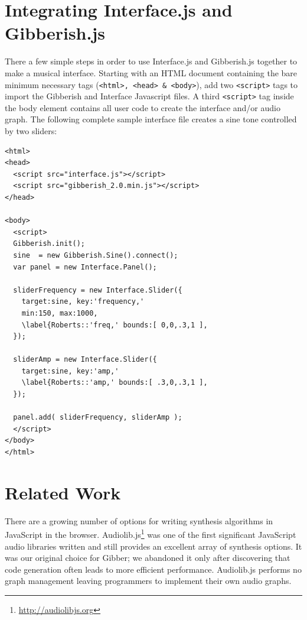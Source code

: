 \section{Integrating Interface.js and Gibberish.js}
\label{Roberts:sec:integrating}

There a few simple steps in order to use Interface.js and Gibberish.js together to make a musical interface. Starting with an HTML document containing the bare minimum necessary tags (\texttt{<html>, <head> \& <body>}), add two \texttt{<script>} tags to import the Gibberish and Interface Javascript files. A third \texttt{<script>} tag inside the body element contains all user code to create the interface and/or audio graph. The following complete sample interface file creates a sine tone controlled by two sliders:

{\small 
\begin{verbatim}
<html>
<head>
  <script src="interface.js"></script>
  <script src="gibberish_2.0.min.js"></script>
</head>

<body>
  <script>
  Gibberish.init();
  sine  = new Gibberish.Sine().connect();
  var panel = new Interface.Panel();
  
  sliderFrequency = new Interface.Slider({
    target:sine, key:'frequency,'
    min:150, max:1000,
    \label{Roberts::'freq,' bounds:[ 0,0,.3,1 ],
  });
    
  sliderAmp = new Interface.Slider({
    target:sine, key:'amp,'
    \label{Roberts::'amp,' bounds:[ .3,0,.3,1 ],
  });
    
  panel.add( sliderFrequency, sliderAmp );
  </script>
</body>
</html>
\end{verbatim}
}


\section{Related Work}
\label{Roberts:sec:RelatedWork}

There are a growing number of options for writing synthesis algorithms in JavaScript in the browser. Audiolib.js\footnote{\url{http://audiolibjs.org}} was one of the first significant JavaScript audio libraries written and still provides an excellent array of synthesis options. It was our original choice for Gibber; we abandoned it only after discovering that code generation often leads to more efficient performance. Audiolib.js performs no graph management leaving programmers to implement their own audio graphs.

